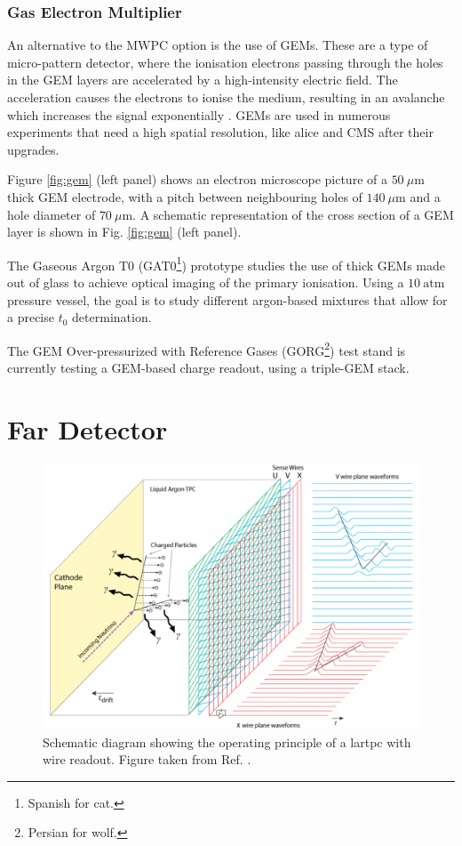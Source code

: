 \subsubsection{Gas Electron Multiplier}

An alternative to the MWPC option is the use of GEMs. These are a type of micro-pattern detector, where the ionisation electrons passing through the holes in the GEM layers are accelerated by a high-intensity electric field. The acceleration causes the electrons to ionise the medium, resulting in an avalanche which increases the signal exponentially \cite{Sauli1997}. GEMs are used in numerous experiments that need a high spatial resolution, like \gls{alice} \cite{Lippmann2016} and CMS \cite{Calabria2016} after their upgrades.

Figure \ref{fig:gem} (left panel) shows an electron microscope picture of a $50~\mu\mathrm{m}$ thick GEM electrode, with a pitch between neighbouring holes of $140~\mu\mathrm{m}$ and a hole diameter of $70~\mu\mathrm{m}$. A schematic representation of the cross section of a GEM layer is shown in Fig. \ref{fig:gem} (left panel).

The Gaseous Argon T0 (GAT0\footnote{Spanish for cat.}) prototype studies the use of thick GEMs made out of glass to achieve optical imaging of the primary ionisation. Using a $10~\mathrm{atm}$ pressure vessel, the goal is to study different argon-based mixtures that allow for a precise $t_{0}$ determination.

The GEM Over-pressurized with Reference Gases (GORG\footnote{Persian for wolf.}) test stand is currently testing a GEM-based charge readout, using a triple-GEM stack.

\section{Far Detector}

\begin{figure}[t]
	\centering
	\includegraphics[width=0.8\linewidth]{Images/DUNE/FD/tpc}
	\caption[Schematic diagram showing the operating principle of a \gls{lartpc} with wire readout.]{Schematic diagram showing the operating principle of a \gls{lartpc} with wire readout. Figure taken from Ref. \cite{DUNE2020TDR1}.}
	\label{fig:lartpc}
\end{figure}

